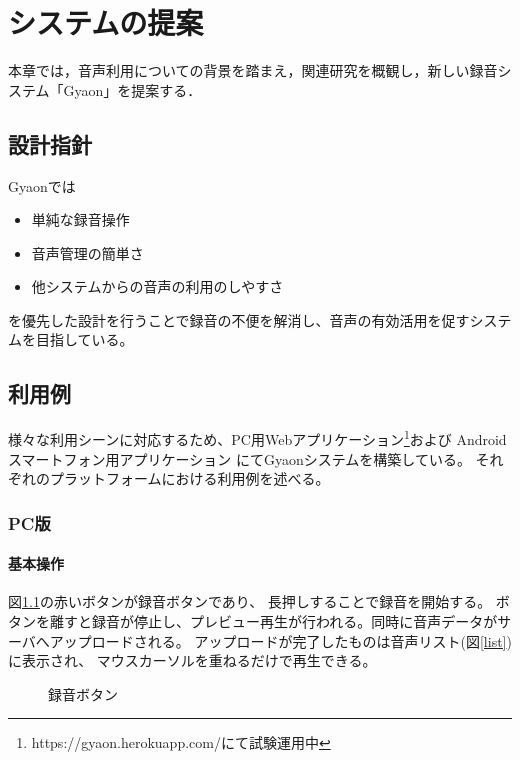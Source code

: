\chapter{システムの提案}
\label{chap:proposal}

本章では，音声利用についての背景を踏まえ，関連研究を概観し，新しい録音システム「Gyaon」を提案する．

\newpage

\section{設計指針}

Gyaonでは
\begin{itemize}
\item 単純な録音操作
\item 音声管理の簡単さ
\item 他システムからの音声の利用のしやすさ
\end{itemize}
を優先した設計を行うことで録音の不便を解消し、音声の有効活用を促すシステムを目指している。

\section{利用例}
様々な利用シーンに対応するため、PC用Webアプリケーション\footnote{\textsf{https://gyaon.herokuapp.com/にて試験運用中}}および
Androidスマートフォン用アプリケーション
にてGyaonシステムを構築している。
それぞれのプラットフォームにおける利用例を述べる。

\subsection{PC版}

\subsubsection{基本操作}
図\ref{button}の赤いボタンが録音ボタンであり、
長押しすることで録音を開始する。
ボタンを離すと録音が停止し、プレビュー再生が行われる。同時に音声データがサーバへアップロードされる。
アップロードが完了したものは音声リスト(図\ref{list})に表示され、
マウスカーソルを重ねるだけで再生できる。

\begin{figure}[H]
\centering
{}
\caption{録音ボタン}
\label{button}
\end{figure}

